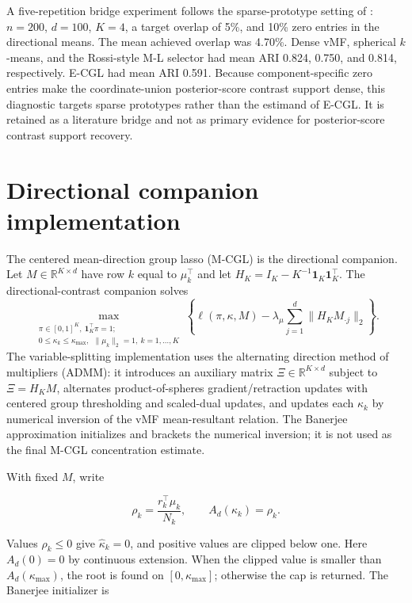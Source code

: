\documentclass[preprint,12pt,authoryear]{elsarticle}
\begin{document}
A five-repetition bridge experiment follows the sparse-prototype setting of
\citet{rossi2022sparsevmf}: $n=200$, $d=100$, $K=4$, a target overlap of 5\%, and
10\% zero entries in the directional means. The mean achieved overlap was
4.70\%. Dense vMF, spherical $k$-means, and the Rossi-style M-L selector had mean
ARI 0.824, 0.750, and 0.814, respectively. E-CGL had mean ARI 0.591. Because
component-specific zero entries make the coordinate-union posterior-score contrast support
dense, this diagnostic targets sparse prototypes rather than the estimand of
E-CGL. It is retained as a literature bridge and not as primary evidence for
posterior-score contrast support recovery.

\section{Directional companion implementation}
\label{sec:s-target-diagnostic}

The centered mean-direction group lasso (M-CGL) is the directional companion.
Let $M\in\mathbb R^{K\times d}$ have row $k$ equal to $\mu_k^\top$ and let
$H_K=I_K-K^{-1}\mathbf 1_K\mathbf 1_K^\top$. The directional-contrast
companion solves
\[
\max_{\substack{
\pi\in[0,1]^K,\ \mathbf 1_K^\top\pi=1;\\
0\leq\kappa_k\leq\kappa_{\max},\
\ \lVert\mu_k\rVert_2=1,\ k=1,\ldots,K
}}
\left\{
\ell(\pi,\kappa,M)
-
\lambda_\mu\sum_{j=1}^{d}
\lVert H_KM_{\cdot j}\rVert_2
\right\}.
\]
The variable-splitting implementation uses the alternating direction method
of multipliers (ADMM): it introduces an auxiliary matrix
$\Xi\in\mathbb R^{K\times d}$ subject to $\Xi=H_KM$,
alternates product-of-spheres gradient/retraction updates with centered group
thresholding and scaled-dual updates, and updates each $\kappa_k$ by numerical
inversion of the vMF mean-resultant relation. The Banerjee approximation
initializes and brackets the numerical inversion; it is not used as the final
M-CGL concentration estimate.

With fixed $M$, write

\[
\rho_k=\frac{r_k^\top\mu_k}{N_k},
\qquad
A_d(\kappa_k)=\rho_k.
\]

Values $\rho_k\leq0$ give $\widehat\kappa_k=0$, and positive values are clipped
below one. Here $A_d(0)=0$ by continuous extension. When the clipped value is
smaller than $A_d(\kappa_{\max})$, the root is found on
$[0,\kappa_{\max}]$; otherwise the cap is returned. The Banerjee initializer
\citep{banerjee2005vmf} is
\end{document}

